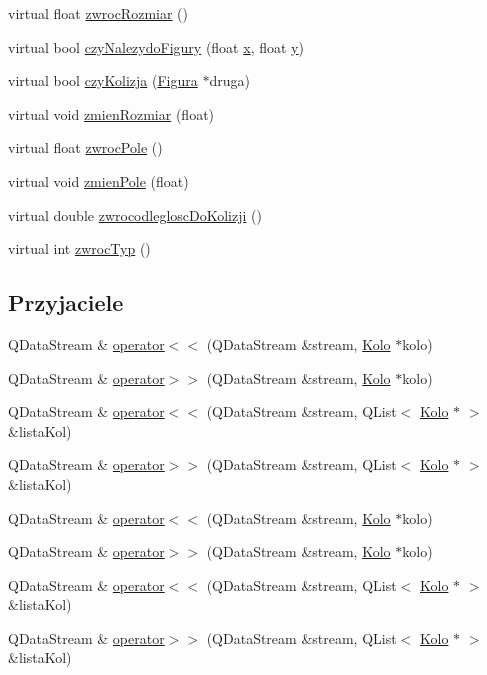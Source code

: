 \begin{DoxyCompactItemize}
virtual float \hyperlink{classKolo_ad118d0c2ed1117b633a72226467eb427}{zwroc\-Rozmiar} ()
\item 
virtual bool \hyperlink{classKolo_a72ea08406dc57802251022ce4b3610af}{czy\-Nalezydo\-Figury} (float \hyperlink{classFigura_ad640a05ebb1ddbf595124f0b31793e8a}{x}, float \hyperlink{classFigura_ab17e5953f2898eb729b2dc506640bce2}{y})
\item 
virtual bool \hyperlink{classKolo_a6877ef8b09a94c8fd65a52e538821890}{czy\-Kolizja} (\hyperlink{classFigura}{Figura} $\ast$druga)
\item 
virtual void \hyperlink{classKolo_aa8f420ed4ebb1f905c78b3964e68e408}{zmien\-Rozmiar} (float)
\item 
virtual float \hyperlink{classKolo_ae23236b6d35139007f9d64e7f16a27d6}{zwroc\-Pole} ()
\item 
virtual void \hyperlink{classKolo_af634cf63538e8a04081d646749469f6b}{zmien\-Pole} (float)
\item 
virtual double \hyperlink{classKolo_ac432a050e65fbae273eb9b488247b8b4}{zwrocodleglosc\-Do\-Kolizji} ()
\item 
virtual int \hyperlink{classKolo_af413d5ccc6f715370feb50754e48307d}{zwroc\-Typ} ()
\end{DoxyCompactItemize}
\subsection*{Przyjaciele}
\begin{DoxyCompactItemize}
\item 
Q\-Data\-Stream \& \hyperlink{classKolo_aa61581e0ce86c42a2ee6e8bdeb1a62a6}{operator$<$$<$} (Q\-Data\-Stream \&stream, \hyperlink{classKolo}{Kolo} $\ast$kolo)
\item 
Q\-Data\-Stream \& \hyperlink{classKolo_a22f6faefdd5da21ac8da0b2774b6e315}{operator$>$$>$} (Q\-Data\-Stream \&stream, \hyperlink{classKolo}{Kolo} $\ast$kolo)
\item 
Q\-Data\-Stream \& \hyperlink{classKolo_a8434c0df2b3e44b1b0363ed8461c915f}{operator$<$$<$} (Q\-Data\-Stream \&stream, Q\-List$<$ \hyperlink{classKolo}{Kolo} $\ast$ $>$ \&lista\-Kol)
\item 
Q\-Data\-Stream \& \hyperlink{classKolo_a402d820c53425640a00c68b9f538ac2c}{operator$>$$>$} (Q\-Data\-Stream \&stream, Q\-List$<$ \hyperlink{classKolo}{Kolo} $\ast$ $>$ \&lista\-Kol)
\item 
Q\-Data\-Stream \& \hyperlink{classKolo_aa61581e0ce86c42a2ee6e8bdeb1a62a6}{operator$<$$<$} (Q\-Data\-Stream \&stream, \hyperlink{classKolo}{Kolo} $\ast$kolo)
\item 
Q\-Data\-Stream \& \hyperlink{classKolo_a22f6faefdd5da21ac8da0b2774b6e315}{operator$>$$>$} (Q\-Data\-Stream \&stream, \hyperlink{classKolo}{Kolo} $\ast$kolo)
\item 
Q\-Data\-Stream \& \hyperlink{classKolo_a8434c0df2b3e44b1b0363ed8461c915f}{operator$<$$<$} (Q\-Data\-Stream \&stream, Q\-List$<$ \hyperlink{classKolo}{Kolo} $\ast$ $>$ \&lista\-Kol)
\item 
Q\-Data\-Stream \& \hyperlink{classKolo_a402d820c53425640a00c68b9f538ac2c}{operator$>$$>$} (Q\-Data\-Stream \&stream, Q\-List$<$ \hyperlink{classKolo}{Kolo} $\ast$ $>$ \&lista\-Kol)
\end{DoxyCompactItemize}
